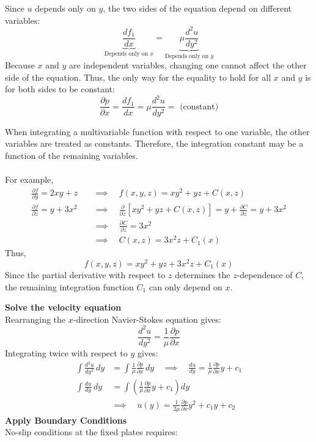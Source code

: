 ﻿\documentclass[12pt]{article}
\begin{document}
Since $u$ depends only on $y$, the two sides of the equation depend on different variables:
\[
\underbrace{\frac{df_1}{dx}}_{\text{Depends only on }x}
=
\underbrace{\mu\frac{d^2u}{dy^2}}_{\text{Depends only on }y}
\]
Because $x$ and $y$ are independent variables, changing one cannot affect the other side of the equation. Thus, the only way for the equality to hold for all $x$ and $y$ is for both sides to be constant:
\[
\frac{\partial p}{\partial x}= \frac{d f_1}{dx}=\mu\frac{d^2u}{dy^2}= \text{ (constant)}
\]
\begin{notebox}
When integrating a multivariable function with respect to one variable, the other variables are treated as constants. Therefore, the integration constant may be a function of the remaining variables.\\\\
For example,
\[
\begin{aligned}
\frac{\partial f}{\partial y}=2xy+z
&\quad\implies\quad
f(x,y,z)=xy^2+yz+C(x,z)\\[6pt]
\frac{\partial f}{\partial z}=y+3x^2
&\quad\implies\quad
\frac{\partial}{\partial z}\left[xy^2+yz+C(x,z)\right]=y+\frac{\partial C}{\partial z}=y+3x^2\\
&\quad\implies\quad
\frac{\partial C}{\partial z}=3x^2\\
&\quad\implies\quad
C(x,z)=3x^2z+C_1(x)
\end{aligned}
\]
Thus,
\[
\boxed{f(x,y,z)=xy^2+yz+3x^2z+C_1(x)}
\]
Since the partial derivative with respect to $z$ determines the $z$-dependence of $C$, the remaining integration function $C_1$ can only depend on $x$.
\end{notebox}
\textbf{Solve the velocity equation}\\
Rearranging the $x$-direction Navier-Stokes equation gives:
\[
\frac{d^2u}{dy^2}=\frac1\mu\frac{\partial p}{\partial x}
\]
Integrating twice with respect to $y$ gives:
\[
\begin{aligned}
\int\frac{d^2u}{dy^2}\,dy&=\int\frac{1}{\mu}\frac{\partial p}{\partial x}\,dy
\quad\implies\quad
\frac{du}{dy}=\frac{1}{\mu}\frac{\partial p}{\partial x}y+c_1\\[6pt]
\int\frac{du}{dy}\,dy&=\int\left(\frac{1}{\mu}\frac{\partial p}{\partial x}y+c_1\right)dy\\[6pt]
&\implies\quad
u(y)=\frac{1}{2\mu}\frac{\partial p}{\partial x}y^2+c_1y+c_2
\end{aligned}
\]
\textbf{Apply Boundary Conditions}\\
No-slip conditions at the fixed plates requires:
\end{document}
